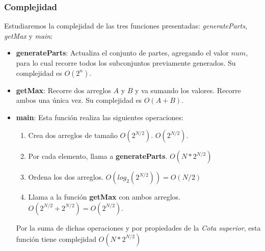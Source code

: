 \subsubsection{Complejidad}
Estudiaremos la complejidad de las tres funciones presentadas: \emph{generateParts, getMax} y \emph{main}:
\begin{itemize}
	\item \textbf{generateParts}: Actualiza el conjunto de partes, agregando el valor $num$, para lo cual recorre todos los subconjuntos previamente generados. Su complejidad es $O(2^n)$.
	\item \textbf{getMax}: Recorre dos arreglos $A$ y $B$ y va sumando los valores. Recorre ambos una única vez. Su complejidad es $O(A+B)$.
	\item \textbf{main}: Esta función realiza las siguientes operaciones:
	\begin{enumerate}
		\item Crea dos arreglos de tamaño $O(2^{N/2})$. $O(2^{N/2})$.
		\item Por cada elemento, llama a \textbf{generateParts}. $O(N*2^{N/2})$
		\item Ordena los dos arreglos. $O(log_{2}(2^{N/2})) = O(N/2)$
		\item Llama a la función \textbf{getMax} con ambos arreglos. $O(2^{N/2} + 2^{N/2}) = O(2^{N/2})$.
	\end{enumerate}
	Por la suma de dichas operaciones y por propiedades de la \emph{Cota superior}, esta función tiene complejidad $O(N*2^{N/2})$
\end{itemize}